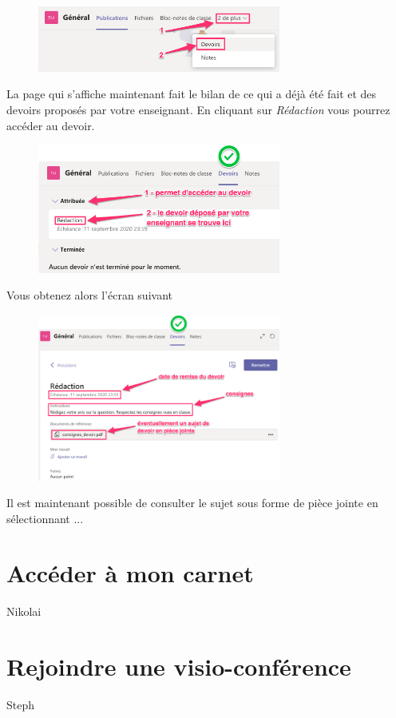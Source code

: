 \begin{figure}[h]
\includegraphics[width=8cm]{./images/teams/devoir1}
\centering
\end{figure}

La page qui s'affiche maintenant fait le bilan de ce qui a déjà été fait et des devoirs proposés par votre enseignant. En cliquant sur \textit{Rédaction} vous pourrez accéder au devoir.\\

\begin{figure}[h]
\includegraphics[width=8cm]{./images/teams/devoir2}
\centering
\end{figure}

 Vous obtenez alors l'écran suivant
\newpage
\begin{figure}[h]
\includegraphics[width=8cm]{./images/teams/devoir3}
\centering
\end{figure}

Il est maintenant possible de consulter le sujet sous forme de pièce jointe en sélectionnant ...

\section{Accéder à mon carnet}

Nikolai

\section{Rejoindre une visio-conférence}

Steph


